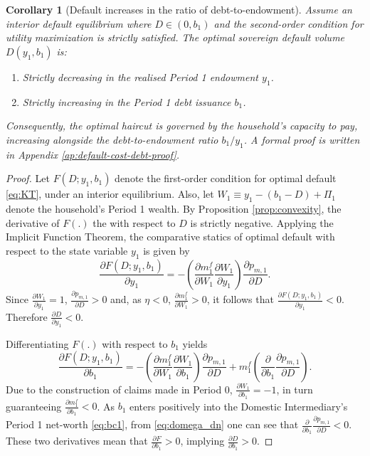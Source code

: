 \documentclass[11pt]{article}
\theoremstyle{definition}
\theoremstyle{plain}
\newtheorem{corollary}{Corollary}
\theoremstyle{remark}
\begin{document}
\begin{appendices}
\begin{corollary}[Default increases in the ratio of debt-to-endowment]\label{corol:inv-debt-gdp}
Assume an interior default equilibrium where $D\in(0,b_1)$ and the second-order condition for utility maximization is strictly satisfied. The optimal sovereign default volume $D(y_1, b_1)$ is:
\begin{enumerate}[label=(\roman*)]
    \item Strictly decreasing in the realised Period 1 endowment $y_1$.
    \item Strictly increasing in the Period 1 debt issuance $b_1$.
\end{enumerate}
Consequently, the optimal haircut is governed by the household's capacity to pay, increasing alongside the debt-to-endowment ratio $b_1/y_1$. A formal proof is written in Appendix \ref{ap:default-cost-debt-proof}.
\end{corollary}

\begin{proof}
    Let $F(D;y_1,b_1)$ denote the first-order condition for optimal default \eqref{eq:KT}, under an interior equilibrium. Also, let $W_1\equiv y_1-(b_1-D)+\Pi_1$ denote the household's Period 1 wealth. By Proposition \ref{prop:convexity}, the derivative of $F(.)$ the  with respect to $D$ is strictly negative. Applying the Implicit Function Theorem, the comparative statics of optimal default with respect to the state variable $y_1$ is given by
    \begin{equation*}
        \frac{\partial F(D;y_1,b_1)}{\partial y_1}=-\left( \frac{\partial m^f_1}{\partial W_1} \frac{\partial W_1}{\partial y_1} \right)\frac{\partial p_{m,1}}{\partial D}.
    \end{equation*}
    Since $\frac{\partial W_1}{\partial y_1}=1$, $\frac{\partial p_{m,1}}{\partial D}>0$ and, as $\eta<0$, $\frac{\partial m^f_1}{\partial W_1}>0$, it follows that $\frac{\partial F(D;y_1,b_1)}{\partial y_1}<0$. Therefore $\frac{\partial D}{\partial y_1}<0$.

    Differentiating $F(.)$ with respect to $b_1$ yields
    \begin{equation*}
        \frac{\partial F(D;y_1,b_1)}{\partial b_1} = -\left( \frac{\partial m^f_1}{\partial W_1} \frac{\partial W_1}{\partial b_1} \right)\frac{\partial p_{m,1}}{\partial D}+m^f_1\left( \frac{\partial}{\partial b_1} \frac{\partial p_{m,1}}{\partial D} \right).
    \end{equation*}
    Due to the construction of claims made in Period 0, $\frac{\partial W_1}{\partial b_1}=-1$, in turn guaranteeing $\frac{\partial m^f_1}{\partial b_1}<0$. As $b_1$ enters positively into the Domestic Intermediary's Period 1 net-worth \eqref{eq:bc1}, from \eqref{eq:domega_dn} one can see that $\frac{\partial}{\partial b_1}\frac{\partial p_{m,1}}{\partial D}<0$. These two derivatives mean that $\frac{\partial F}{\partial b_1}>0$, implying $\frac{\partial D}{\partial b_1}>0$.
\end{proof}


\end{appendices}
\end{document}
